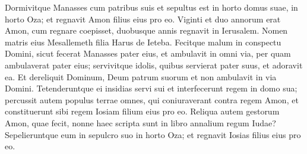 \begin{biblechapter}
\verse Dormivitque Manasses cum patribus suis et sepultus est in horto domus suae, in horto Oza; et regnavit Amon filius eius pro eo. 
\verse Viginti et duo annorum erat Amon, cum regnare coepisset, duobusque annis regnavit in Ierusalem. Nomen matris eius Mesallemeth filia Harus de Ieteba. 
\verse Fecitque malum in conspectu Domini, sicut fecerat Manasses pater eius, 
\verse et ambulavit in omni via, per quam ambulaverat pater eius; servivitque idolis, quibus servierat pater suus, et adoravit ea. 
\verse Et dereliquit Dominum, Deum patrum suorum et non ambulavit in via Domini. 
\verse Tetenderuntque ei insidias servi sui et interfecerunt regem in domo sua;  
\verse percussit autem populus terrae omnes, qui coniuraverant contra regem Amon, et constituerunt sibi regem Iosiam filium eius pro eo. 
\verse Reliqua autem gestorum Amon, quae fecit, nonne haec scripta sunt in libro annalium regum Iudae? 
\verse Sepelieruntque eum in sepulcro suo in horto Oza; et regnavit Iosias filius eius pro eo. 
\end{biblechapter}

